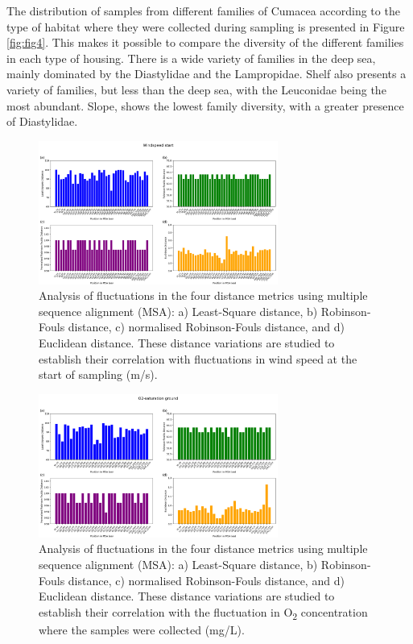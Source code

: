 The distribution of samples from different families of Cumacea according to the type of habitat where they were collected during sampling is presented in Figure \ref{fig:fig4}. This makes it possible to compare the diversity of the different families in each type of housing. There is a wide variety of families in the deep sea, mainly dominated by the Diastylidae and the Lampropidae. Shelf also presents a variety of families, but less than the deep sea, with the Leuconidae being the most abundant. Slope, shows the lowest family diversity, with a greater presence of Diastylidae. 


\begin{figure}[]
    \centering
    \includegraphics[width=0.7\textwidth]{figure5.png}
    \caption{Analysis of fluctuations in the four distance metrics using multiple sequence alignment (MSA): a) Least-Square distance, b) Robinson-Fouls distance, c) normalised Robinson-Fouls distance, and d) Euclidean distance. These distance variations are studied to establish their correlation with fluctuations in wind speed at the start of sampling (m/s). \label{fig:fig5}}
\end{figure}

\begin{figure}[]
    \centering
    \includegraphics[width=0.7\textwidth]{figure6.png}
    \caption{Analysis of fluctuations in the four distance metrics using multiple sequence alignment (MSA): a) Least-Square distance, b) Robinson-Fouls distance, c) normalised Robinson-Fouls distance, and d) Euclidean distance. These distance variations are studied to establish their correlation with the fluctuation in O\textsubscript{2} concentration where the samples were collected (mg/L). \label{fig:fig6}}
\end{figure}

